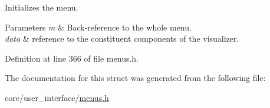 Initializes the menu. 


\begin{DoxyParams}{Parameters}
{\em m} & Back-\/reference to the whole menu. \\
\hline
{\em data} & reference to the constituent components of the visualizer. \\
\hline
\end{DoxyParams}


Definition at line 366 of file menus.\+h.



The documentation for this struct was generated from the following file\+:\begin{DoxyCompactItemize}
\item 
core/user\+\_\+interface/\hyperlink{menus_8h}{menus.\+h}\end{DoxyCompactItemize}

